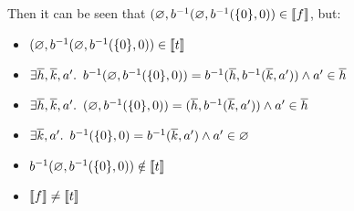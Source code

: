 Then it can be seen that $(\varnothing,b^{-1}(\varnothing,b^{-1}(\{0\},0))\in\llbracket f \rrbracket$, but:
\begin{itemize}
  \item[\phantom{\imps}]
    $(\varnothing,b^{-1}(\varnothing,b^{-1}(\{0\},0))\in\llbracket t \rrbracket$

  \item[\iffs]
    $\exists\overline{h},\overline{k},a^\prime\ldotp~b^{-1}(\varnothing,b^{-1}(\{0\},0)) = b^{-1}(\overline{h}, b^{-1}(\overline{k},a^\prime))\land a^\prime\in\overline{h}$

  \item[\iffs]
    $\exists\overline{h},\overline{k},a^\prime\ldotp~(\varnothing,b^{-1}(\{0\},0)) = (\overline{h}, b^{-1}(\overline{k},a^\prime))\land a^\prime\in\overline{h}$

  \item[\iffs]
    $\exists\overline{k},a^\prime\ldotp~b^{-1}(\{0\},0) = b^{-1}(\overline{k},a^\prime)\land a^\prime\in\varnothing$

  \item[\imps]
    $b^{-1}(\varnothing,b^{-1}(\{0\},0))\notin\llbracket t \rrbracket$

  \item[\imps]
    $\llbracket f \rrbracket\neq\llbracket t \rrbracket$
\end{itemize}
